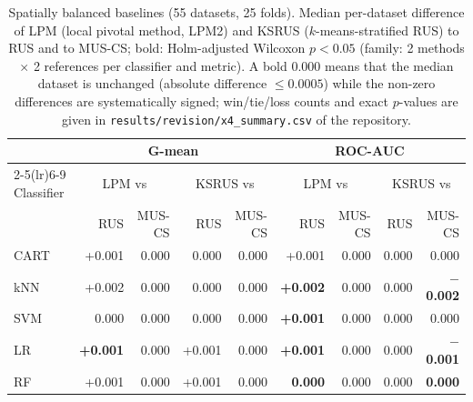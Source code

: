 \begin{table}[htbp]
\centering\footnotesize
\setlength{\tabcolsep}{4pt}
\caption{Spatially balanced baselines (55 datasets, 25 folds). Median per-dataset difference of LPM (local pivotal method, LPM2) and KSRUS ($k$-means-stratified RUS) to RUS and to MUS-CS; bold: Holm-adjusted Wilcoxon $p<0.05$ (family: 2 methods $\times$ 2 references per classifier and metric). A bold 0.000 means that the median dataset is unchanged (absolute difference $\leq 0.0005$) while the non-zero differences are systematically signed; win/tie/loss counts and exact $p$-values are given in \texttt{results/revision/x4\_summary.csv} of the repository.}
\label{tab:x4}
\begin{tabular}{lrrrrrrrr}
\toprule
 & \multicolumn{4}{c}{G-mean} & \multicolumn{4}{c}{ROC-AUC}\\
\cmidrule(lr){2-5}\cmidrule(lr){6-9}
Classifier & \multicolumn{2}{c}{LPM vs} & \multicolumn{2}{c}{KSRUS vs} & \multicolumn{2}{c}{LPM vs} & \multicolumn{2}{c}{KSRUS vs}\\
 & RUS & MUS-CS & RUS & MUS-CS & RUS & MUS-CS & RUS & MUS-CS\\
\midrule
CART & +0.001 & 0.000 & 0.000 & 0.000 & +0.001 & 0.000 & 0.000 & 0.000\\
kNN & +0.002 & 0.000 & 0.000 & 0.000 & \textbf{+0.002} & 0.000 & 0.000 & \textbf{$-$0.002}\\
SVM & 0.000 & 0.000 & 0.000 & 0.000 & \textbf{+0.001} & 0.000 & 0.000 & 0.000\\
LR & \textbf{+0.001} & 0.000 & +0.001 & 0.000 & \textbf{+0.001} & 0.000 & 0.000 & \textbf{$-$0.001}\\
RF & +0.001 & 0.000 & +0.001 & 0.000 & \textbf{0.000} & 0.000 & 0.000 & \textbf{0.000}\\
\bottomrule
\end{tabular}
\end{table}

